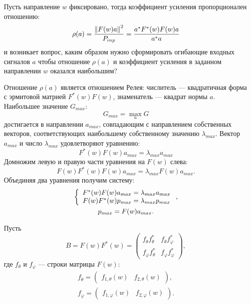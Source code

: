 Пусть направление $w$ фиксировано, тогда коэффициент усиления пропорционален отношению:
\[
    \rho(a)
    = \frac{\left \| F(w) a \right \|^2}{P_{inp}}
    = \frac{a^* F^*(w) F(w) a}{a^* a}
\]
и возникает вопрос, каким образом нужно сформировать огибающие входных сигналов $a$ чтобы отношение $\rho(a)$ и коэффициент усиления в заданном направлении $w$
оказался наибольшим?

Отношение $\rho(a)$ является отношением Релея: числитель --- квадратичная форма с эрмитовой матрией $F^*(w) F(w)$, знаменатель --- квадрат нормы $a$.
Наибольшее значение $G_{max}$:
\[
    G_{max} = \max \limits_{a} G
\]
достигается в направлении $a_{max}$, совпадающим с направлением собственных векторов, соответствующих наибольшему собственному значению $\lambda_{max}$.
Вектор $a_{max}$ и число $\lambda_{max}$ удовлетворяют уравнению:
\[
    F^*(w) F(w) a_{max} = \lambda_{max} a_{max}
\]
Домножим левую и правую части уравнения на $F(w)$ слева:
\[
    F(w) F^*(w) F(w) a_{max} = \lambda_{max} F(w) a_{max} .
\]
Объединяя два уравнения получим систему:
\begin{gather}
    \left \{
    \begin{array}{c}
        F^*(w) F(w) a_{max} = \lambda_{max} a_{max} \\
        F(w) F^*(w) p_{max} = \lambda_{max} p_{max}
    \end{array}
    \right .
    \label{emission:emitter:gain:system}, \\
    p_{max} = F(w) a_{max} \notag.
\end{gather}

Пусть
\[
    B
    = F(w) F^*(w)
    = \begin{pmatrix}
          f_\theta f_\theta^*  & f_{\theta} f_\varphi^* \\
          f_\varphi f_\theta^* & f_\varphi f_\varphi^*
    \end{pmatrix} ,
\]
где $f_\theta$ и $f_\varphi$ --- строки матрицы $F(w)$:
\begin{gather*}
    f_\theta
    = \begin{pmatrix}
          f_{1,\theta}(w) & f_{2,\theta}(w)
    \end{pmatrix}, \\
    f_\varphi
    = \begin{pmatrix}
          f_{1,\varphi}(w) & f_{2,\varphi}(w)
    \end{pmatrix} .
\end{gather*}

